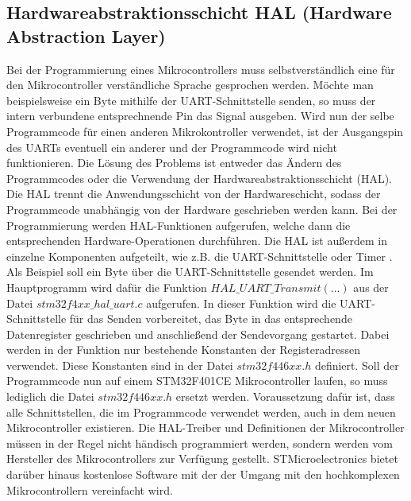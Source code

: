 \subsection{Hardwareabstraktionsschicht HAL (Hardware Abstraction Layer)}
Bei der Programmierung eines Mikrocontrollers muss selbstverständlich eine für den Mikrocontroller verständliche Sprache gesprochen werden. Möchte man beispielsweise ein Byte mithilfe der UART-Schnittstelle senden, so muss der intern verbundene entsprechnende Pin das Signal ausgeben. Wird nun der selbe Programmcode für einen anderen Mikrokontroller verwendet, ist der Ausgangspin des UARTs eventuell ein anderer und der Programmcode wird nicht funktionieren. Die Lösung des Problems ist entweder das Ändern des Programmcodes oder die Verwendung der Hardwareabstraktionsschicht (HAL). Die HAL trennt die Anwendungsschicht von der Hardwareschicht, sodass der Programmcode unabhängig von der Hardware geschrieben werden kann. Bei der Programmierung werden HAL-Funktionen aufgerufen, welche dann die entsprechenden Hardware-Operationen durchführen. Die HAL ist außerdem in einzelne Komponenten aufgeteilt, wie z.B. die UART-Schnittstelle oder Timer \cite[S.77 ff.]{IoTSystems}. Als Beispiel soll ein Byte über die UART-Schnittstelle gesendet werden. Im Hauptprogramm wird dafür die Funktion $HAL\_UART\_Transmit(...)$ aus der Datei $stm32f4xx\_hal\_uart.c$ aufgerufen. In dieser Funktion wird die UART-Schnittstelle für das Senden vorbereitet, das Byte in das entsprechende Datenregister geschrieben und anschließend der Sendevorgang gestartet. Dabei werden in der Funktion nur bestehende Konstanten der Registeradressen verwendet. Diese Konstanten sind in der Datei $stm32f446xx.h$ definiert. Soll der Programmcode nun auf einem STM32F401CE Mikrocontroller laufen, so muss lediglich die Datei $stm32f446xx.h$ ersetzt werden. Voraussetzung dafür ist, dass alle Schnittstellen, die im Programmcode verwendet werden, auch in dem neuen Mikrocontroller existieren. Die HAL-Treiber und Definitionen der Mikrocontroller müssen in der Regel nicht händisch programmiert werden, sondern werden vom Hersteller des Mikrocontrollers zur Verfügung gestellt. STMicroelectronics bietet darüber hinaus kostenlose Software mit der der Umgang mit den hochkomplexen Mikrocontrollern vereinfacht wird.